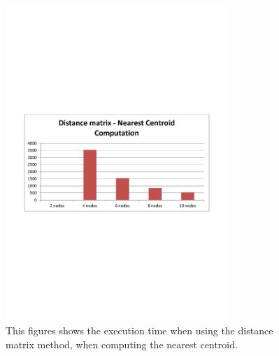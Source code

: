 \begin{figure}[ht]
\centering
\includegraphics[trim = 10mm 90mm 10mm 90mm, clip, width=0.75\textwidth]{Figures/experiments/nearestcentroid_dist.pdf}
\caption{This figures shows the execution time when using the distance matrix method, when computing the nearest centroid.}
\label{fig:results_nearestcentroiddist}
\end{figure}

